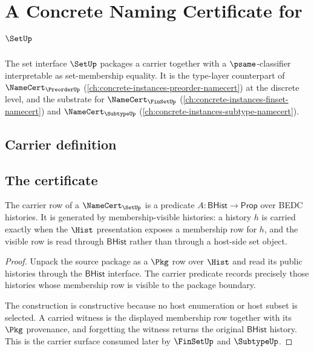 \chapter{A Concrete Naming Certificate for $\SetUp$}
\label{ch:concrete-instances-set-namecert}

The set interface $\SetUp$ packages a carrier together with a $\psame$-classifier interpretable as set-membership equality. It is the type-layer counterpart of $\NameCert_{\PreorderUp}$ (\autoref{ch:concrete-instances-preorder-namecert}) at the discrete level, and the substrate for $\NameCert_{\FinSetUp}$ (\autoref{ch:concrete-instances-finset-namecert}) and $\NameCert_{\SubtypeUp}$ (\autoref{ch:concrete-instances-subtype-namecert}).

\section{Carrier definition}
\label{sec:set-carrier}

\section{The certificate}
\label{sec:set-certificate}

\begin{theorem}
\label{thm:set-carrier-obligation}
The carrier row of a $\NameCert_{\SetUp}$ is a predicate $A:\mathsf{BHist}\to\mathsf{Prop}$ over BEDC histories. It is generated by membership-visible histories: a history $h$ is carried exactly when the $\Hist$ presentation exposes a membership row for $h$, and the visible row is read through $\mathsf{BHist}$ rather than through a host-side set object.
\end{theorem}
\begin{proof}
Unpack the source package as a $\Pkg$ row over $\Hist$ and read its public histories through the $\mathsf{BHist}$ interface. The carrier predicate records precisely those histories whose membership row is visible to the package boundary.

The construction is constructive because no host enumeration or host subset is selected. A carried witness is the displayed membership row together with its $\Pkg$ provenance, and forgetting the witness returns the original $\mathsf{BHist}$ history. This is the carrier surface consumed later by $\FinSetUp$ and $\SubtypeUp$.
\end{proof}

